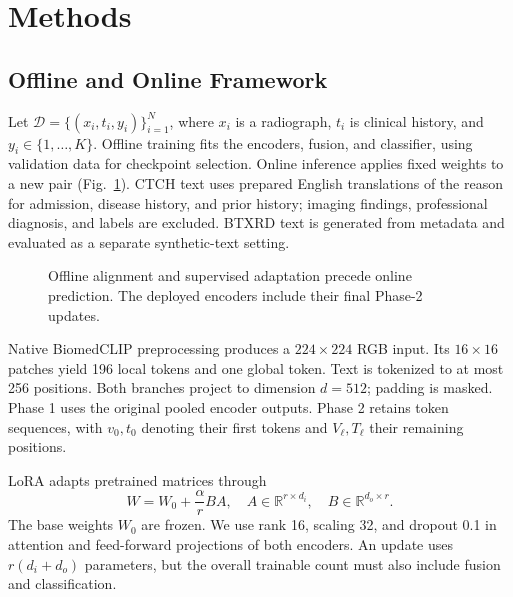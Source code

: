 \documentclass[conference,a4paper]{IEEEtran}
\begin{document}
\section{Methods}
\subsection{Offline and Online Framework}
Let $\mathcal D=\{(x_i,t_i,y_i)\}_{i=1}^N$, where $x_i$ is a radiograph, $t_i$ is clinical history, and $y_i\in\{1,\ldots,K\}$. Offline training fits the encoders, fusion, and classifier, using validation data for checkpoint selection. Online inference applies fixed weights to a new pair (Fig.~\ref{fig:framework}). CTCH text uses prepared English translations of the reason for admission, disease history, and prior history; imaging findings, professional diagnosis, and labels are excluded. BTXRD text is generated from metadata and evaluated as a separate synthetic-text setting.

\begin{figure}[t]
\centering\resizebox{\columnwidth}{!}{}
\caption{Offline alignment and supervised adaptation precede online prediction. The deployed encoders include their final Phase-2 updates.}
\label{fig:framework}
\end{figure}

Native BiomedCLIP preprocessing produces a $224\times224$ RGB input. Its $16\times16$ patches yield 196 local tokens and one global token. Text is tokenized to at most 256 positions. Both branches project to dimension $d=512$; padding is masked. Phase 1 uses the original pooled encoder outputs. Phase 2 retains token sequences, with $v_0,t_0$ denoting their first tokens and $V_\ell,T_\ell$ their remaining positions.

LoRA adapts pretrained matrices through
\begin{equation}
W=W_0+\frac{\alpha}{r}BA,
\quad A\in\mathbb R^{r\times d_i},\quad B\in\mathbb R^{d_o\times r}.
\label{eq:lora}
\end{equation}
The base weights $W_0$ are frozen. We use rank 16, scaling 32, and dropout 0.1 in attention and feed-forward projections of both encoders. An update uses $r(d_i+d_o)$ parameters, but the overall trainable count must also include fusion and classification.
\end{document}
